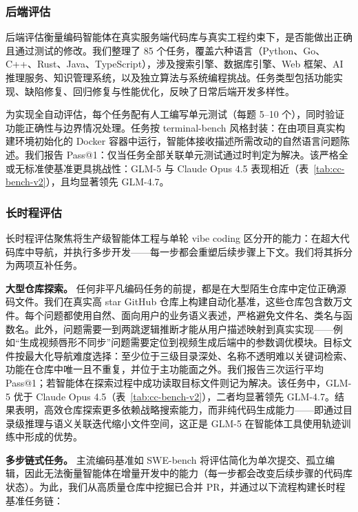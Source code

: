 \subsubsection{后端评估}

后端评估衡量编码智能体在真实服务端代码库与真实工程约束下，是否能做出正确且通过测试的修改。我们整理了 85 个任务，覆盖六种语言（Python、Go、C++、Rust、Java、TypeScript），涉及搜索引擎、数据库引擎、Web 框架、AI 推理服务、知识管理系统，以及独立算法与系统编程挑战。任务类型包括功能实现、缺陷修复、回归修复与性能优化，反映了日常后端开发多样性。

为实现全自动评估，每个任务配有人工编写单元测试（每题 5--10 个），同时验证功能正确性与边界情况处理。任务按 terminal-bench 风格封装：在由项目真实构建环境初始化的 Docker 容器中运行，智能体接收描述所需改动的自然语言问题陈述。我们报告 Pass@1：仅当任务全部关联单元测试通过时判定为解决。该严格全或无标准使基准更具挑战性：GLM-5 与 Claude Opus 4.5 表现相近（表~\ref{tab:cc-bench-v2}），且均显著领先 GLM-4.7。

\subsubsection{长时程评估}

长时程评估聚焦将生产级智能体工程与单轮 vibe coding 区分开的能力：在超大代码库中导航，并执行多步开发——每一步都会重塑后续步骤上下文。我们将其拆分为两项互补任务。

\textbf{大型仓库探索。} 任何非平凡编码任务的前提，都是在大型陌生仓库中定位正确源码文件。我们在真实高 star GitHub 仓库上构建自动化基准，这些仓库包含数万文件。每个问题都使用自然、面向用户的业务语义表述，严格避免文件名、类名与函数名。此外，问题需要一到两跳逻辑推断才能从用户描述映射到真实实现——例如“生成视频唇形不同步”问题需要定位到视频生成后端中的参数调优模块。目标文件按最大化导航难度选择：至少位于三级目录深处、名称不透明难以关键词检索、功能在仓库中唯一且不重复，并位于主功能面之外。我们报告三次运行平均 Pass@1；若智能体在探索过程中成功读取目标文件则记为解决。该任务中，GLM-5 优于 Claude Opus 4.5（表~\ref{tab:cc-bench-v2}），二者均显著领先 GLM-4.7。结果表明，高效仓库探索更多依赖战略搜索能力，而非纯代码生成能力——即通过目录级推理与语义关联迭代缩小文件空间，这正是 GLM-5 在智能体工具使用轨迹训练中形成的优势。

\textbf{多步链式任务。} 主流编码基准如 SWE-bench 将评估简化为单次提交、孤立编辑，因此无法衡量智能体在增量开发中的能力（每一步都会改变后续步骤的代码库状态）。为此，我们从高质量仓库中挖掘已合并 PR，并通过以下流程构建长时程基准任务链：

